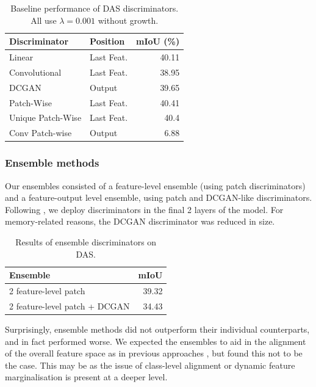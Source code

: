 \documentclass[a4paper,12pt]{report}
\begin{document}
\begin{table}[h]
    \centering
    \begin{tabular}{|l|l|r|}
        \hline
        Discriminator     & Position   & \multicolumn{1}{l|}{mIoU (\%)} \\ \hline
        Linear            & Last Feat. & 40.11                          \\ \hline
        Convolutional     & Last Feat. & 38.95                          \\ \hline
        DCGAN             & Output     & 39.65                          \\ \hline
        Patch-Wise        & Last Feat. & 40.41                          \\ \hline
        Unique Patch-Wise & Last Feat. & 40.4                           \\ \hline
        Conv Patch-wise   & Output     & 6.88                           \\ \hline
    \end{tabular}
    \caption{Baseline performance of DAS discriminators. All use $\lambda=0.001$ without growth.}
\end{table}

\subsubsection{Ensemble methods}
Our ensembles consisted of a feature-level ensemble (using patch discriminators) and a feature-output level ensemble, using patch and DCGAN-like discriminators. Following \cite{tsai_learning_2020}, we deploy discriminators in the final 2 layers of the model. For memory-related reasons, the DCGAN discriminator was reduced in size.

\begin{table}[h]
    \centering
    \begin{tabular}{|l|r|}
        \hline
        Ensemble                      & \multicolumn{1}{l|}{mIoU} \\ \hline
        2 feature-level patch         & 39.32                     \\ \hline
        2 feature-level patch + DCGAN & 34.43                     \\ \hline
    \end{tabular}
    \caption{Results of ensemble discriminators on DAS.}
\end{table}

Surprisingly, ensemble methods did not outperform their individual counterparts, and in fact performed worse. We expected the ensembles to aid in the alignment of the overall feature space as in previous approaches \cite{hoffman_fcns_2016} \cite{chen_learning_2017}, but found this not to be the case. This may be as the issue of class-level alignment or dynamic feature marginalisation is present at a deeper level.
\end{document}
